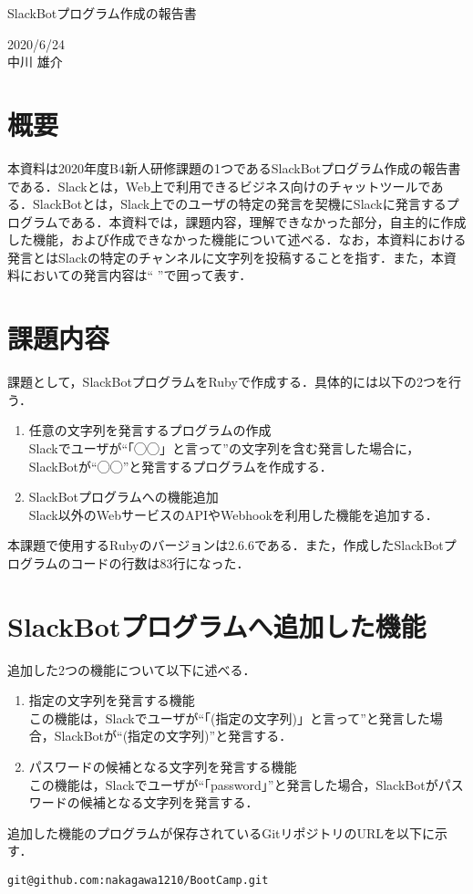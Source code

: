 \documentclass[12pt]{jsarticle}
\begin{document}
\begin{center}
{\LARGE SlackBotプログラム作成の報告書}
\end{center}

\begin{flushright}
  2020/6/24\\
  中川 雄介
\end{flushright}
\section{概要}\label{sec1}
\label{sec:introduction}
本資料は2020年度B4新人研修課題の1つであるSlackBotプログラム作成の報告書である．Slackとは，Web上で利用できるビジネス向けのチャットツールである．SlackBotとは，Slack上でのユーザの特定の発言を契機にSlackに発言するプログラムである．本資料では，課題内容，理解できなかった部分，自主的に作成した機能，および作成できなかった機能について述べる．なお，本資料における発言とはSlackの特定のチャンネルに文字列を投稿することを指す．また，本資料においての発言内容は`` ''で囲って表す．

\section{課題内容}\label{sec2}
課題として，SlackBotプログラムをRubyで作成する．具体的には以下の2つを行う．
\begin{enumerate}
\item 任意の文字列を発言するプログラムの作成\\
  Slackでユーザが``「◯◯」と言って''の文字列を含む発言した場合に，SlackBotが``◯◯''と発言するプログラムを作成する．\label{item1}
\item SlackBotプログラムへの機能追加\\
  Slack以外のWebサービスのAPIやWebhookを利用した機能を追加する．\label{item2}
\end{enumerate}
本課題で使用するRubyのバージョンは2.6.6である．また，作成したSlackBotプログラムのコードの行数は83行になった．

\section{SlackBotプログラムへ追加した機能}\label{func}
追加した2つの機能について以下に述べる．
\begin{enumerate}
\item 指定の文字列を発言する機能\\
  この機能は，Slackでユーザが``「(指定の文字列)」と言って''と発言した場合，SlackBotが``(指定の文字列)''と発言する．
\item パスワードの候補となる文字列を発言する機能\\
  この機能は，Slackでユーザが``「password」''と発言した場合，SlackBotがパスワードの候補となる文字列を発言する．
\end{enumerate}
追加した機能のプログラムが保存されているGitリポジトリのURLを以下に示す．
\begin{verbatim}
git@github.com:nakagawa1210/BootCamp.git
\end{verbatim}
\end{document}
